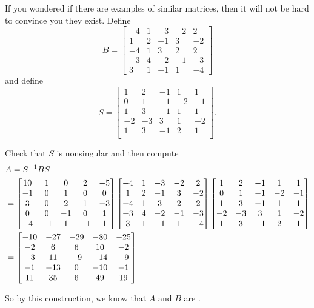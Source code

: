 \documentclass{ximera}
\begin{document}
\begin{example}

If you wondered if there are examples of similar matrices, then it will not be hard to convince you they exist.  Define
\[
B=\begin{bmatrix}
-4 & 1 & -3 & -2 & 2 \\
1 & 2 & -1 & 3 & -2 \\
-4 & 1 & 3 & 2 & 2 \\
-3 & 4 & -2 & -1 & -3 \\
3 & 1 & -1 & 1 & -4
\end{bmatrix}
\]
and define
\[
S=\begin{bmatrix}
1 & 2 & -1 & 1 & 1 \\
0 & 1 & -1 & -2 & -1 \\
1 & 3 & -1 & 1 & 1 \\
-2 & -3 & 3 & 1 & -2 \\
1 & 3 & -1 & 2 & 1\\
\end{bmatrix}.
\]

Check that $S$ is nonsingular and then compute
\begin{align*}
&A=S^{-1}BS\\
&=
\begin{bmatrix}
10 & 1 & 0 & 2 & -5 \\
-1 & 0 & 1 & 0 & 0 \\
3 & 0 & 2 & 1 & -3 \\
0 & 0 & -1 & 0 & 1 \\
-4 & -1 & 1 & -1 & 1
\end{bmatrix}
\begin{bmatrix}
-4 & 1 & -3 & -2 & 2 \\
1 & 2 & -1 & 3 & -2 \\
-4 & 1 & 3 & 2 & 2 \\
-3 & 4 & -2 & -1 & -3 \\
3 & 1 & -1 & 1 & -4
\end{bmatrix}
\begin{bmatrix}
1 & 2 & -1 & 1 & 1 \\
0 & 1 & -1 & -2 & -1 \\
1 & 3 & -1 & 1 & 1 \\
-2 & -3 & 3 & 1 & -2 \\
1 & 3 & -1 & 2 & 1
\end{bmatrix}\\
&=
\begin{bmatrix}
-10 & -27 & -29 & -80 & -25 \\
-2 & 6 & 6 & 10 & -2 \\
-3 & 11 & -9 & -14 & -9 \\
-1 & -13 & 0 & -10 & -1 \\
11 & 35 & 6 & 49 & 19
\end{bmatrix}
\end{align*}

So by this construction, we know that $A$ and $B$ are .

\end{example}
\end{document}

